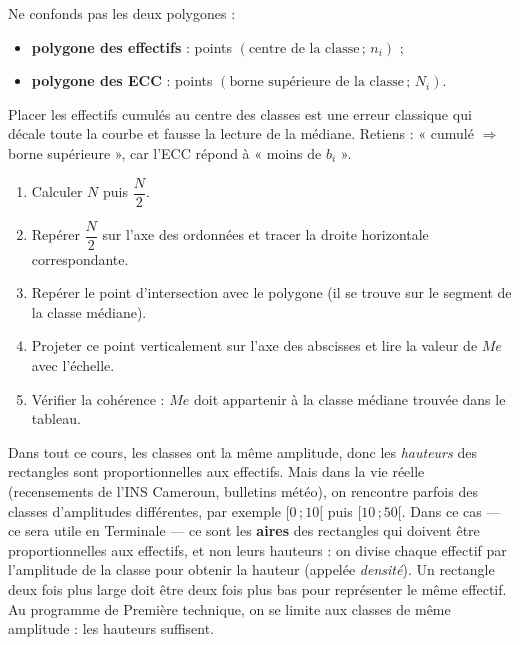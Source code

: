 \documentclass[11pt]{article}
\begin{document}
\begin{attention}
Ne confonds pas les deux polygones :
\begin{itemize}
\item \textbf{polygone des effectifs} : points $(\text{centre de la classe}\,;\,n_i)$ ;
\item \textbf{polygone des ECC} : points $(\text{borne supérieure de la classe}\,;\,N_i)$.
\end{itemize}
Placer les effectifs cumulés au centre des classes est une erreur classique qui décale toute la courbe et fausse la lecture de la médiane. Retiens : « cumulé $\Rightarrow$ borne supérieure », car l'ECC répond à « moins de $b_i$ ».
\end{attention}

\begin{methode}
\begin{enumerate}
\item Calculer $N$ puis $\dfrac{N}{2}$.
\item Repérer $\dfrac{N}{2}$ sur l'axe des ordonnées et tracer la droite horizontale correspondante.
\item Repérer le point d'intersection avec le polygone (il se trouve sur le segment de la classe médiane).
\item Projeter ce point verticalement sur l'axe des abscisses et lire la valeur de $Me$ avec l'échelle.
\item Vérifier la cohérence : $Me$ doit appartenir à la classe médiane trouvée dans le tableau.
\end{enumerate}
\end{methode}

\begin{savaistu}
Dans tout ce cours, les classes ont la même amplitude, donc les \emph{hauteurs} des rectangles sont proportionnelles aux effectifs. Mais dans la vie réelle (recensements de l'INS Cameroun, bulletins météo), on rencontre parfois des classes d'amplitudes différentes, par exemple $[0\,;10[$ puis $[10\,;50[$. Dans ce cas — ce sera utile en Terminale — ce sont les \textbf{aires} des rectangles qui doivent être proportionnelles aux effectifs, et non leurs hauteurs : on divise chaque effectif par l'amplitude de la classe pour obtenir la hauteur (appelée \emph{densité}). Un rectangle deux fois plus large doit être deux fois plus bas pour représenter le même effectif. Au programme de Première technique, on se limite aux classes de même amplitude : les hauteurs suffisent.
\end{savaistu}
\end{document}
